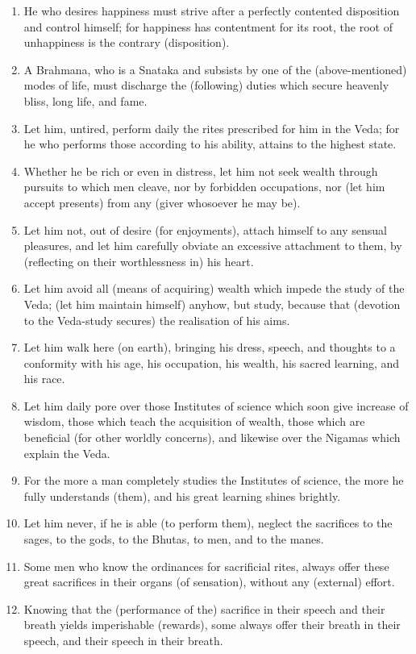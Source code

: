 \begin{enumerate}
\item He who desires happiness must strive after a perfectly contented disposition and control himself; for happiness has contentment for its root, the root of unhappiness is the contrary (disposition).
\item A Brahmana, who is a Snataka and subsists by one of the (above-mentioned) modes of life, must discharge the (following) duties which secure heavenly bliss, long life, and fame.
\item Let him, untired, perform daily the rites prescribed for him in the Veda; for he who performs those according to his ability, attains to the highest state.
\item Whether he be rich or even in distress, let him not seek wealth through pursuits to which men cleave, nor by forbidden occupations, nor (let him accept presents) from any (giver whosoever he may be).
\item Let him not, out of desire (for enjoyments), attach himself to any sensual pleasures, and let him carefully obviate an excessive attachment to them, by (reflecting on their worthlessness in) his heart.
\item Let him avoid all (means of acquiring) wealth which impede the study of the Veda; (let him maintain himself) anyhow, but study, because that (devotion to the Veda-study secures) the realisation of his aims.
\item Let him walk here (on earth), bringing his dress, speech, and thoughts to a conformity with his age, his occupation, his wealth, his sacred learning, and his race.
\item Let him daily pore over those Institutes of science which soon give increase of wisdom, those which teach the acquisition of wealth, those which are beneficial (for other worldly concerns), and likewise over the Nigamas which explain the Veda.
\item For the more a man completely studies the Institutes of science, the more he fully understands (them), and his great learning shines brightly.
\item Let him never, if he is able (to perform them), neglect the sacrifices to the sages, to the gods, to the Bhutas, to men, and to the manes.
\item Some men who know the ordinances for sacrificial rites, always offer these great sacrifices in their organs (of sensation), without any (external) effort.
\item Knowing that the (performance of the) sacrifice in their speech and their breath yields imperishable (rewards), some always offer their breath in their speech, and their speech in their breath.

\end{enumerate}
